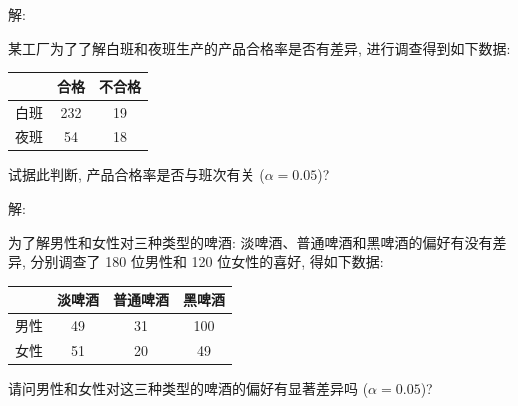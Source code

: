 \documentclass[standard]{ExBook}
\begin{document}
\begin{qitems}
\vspace{-5em}

    \begin{bbox}
解: 
    \end{bbox}

\vspace{-5em}

    \begin{bbox}
    \begin{shaded}
        \qitem
某工厂为了了解白班和夜班生产的产品合格率是否有差异, 进行调查得到如下数据:
\begin{center}
\setlength{\tabcolsep}{63pt}
\begin{tabular}{c|c|c}
\hline
 & 合格 & 不合格 \\
\hline
白班 & 232 & 19 \\
夜班 & 54 & 18 \\
\hline
\end{tabular}
\end{center}
试据此判断, 产品合格率是否与班次有关 ($\alpha=0.05$)?
    \end{shaded}
    \end{bbox}

\vspace{-5em}

    \begin{bbox}
解: 
    \end{bbox}

\vspace{-5em}

    \begin{bbox}
    \begin{shaded}
        \qitem
为了解男性和女性对三种类型的啤酒: 淡啤酒、普通啤酒和黑啤酒的偏好有没有差异, 分别调查了 180 位男性和 120 位女性的喜好, 得如下数据:
\begin{center}
\setlength{\tabcolsep}{43pt}
\begin{tabular}{c|c|c|c}
\hline
 & 淡啤酒 & 普通啤酒 & 黑啤酒 \\
\hline
男性 & 49 & 31 & 100 \\
女性 & 51 & 20 & 49 \\
\hline
\end{tabular}
\end{center}
请问男性和女性对这三种类型的啤酒的偏好有显著差异吗 ($\alpha=0.05$)?
    \end{shaded}
    \end{bbox}

\vspace{-5em}


\end{qitems}
\end{document}
